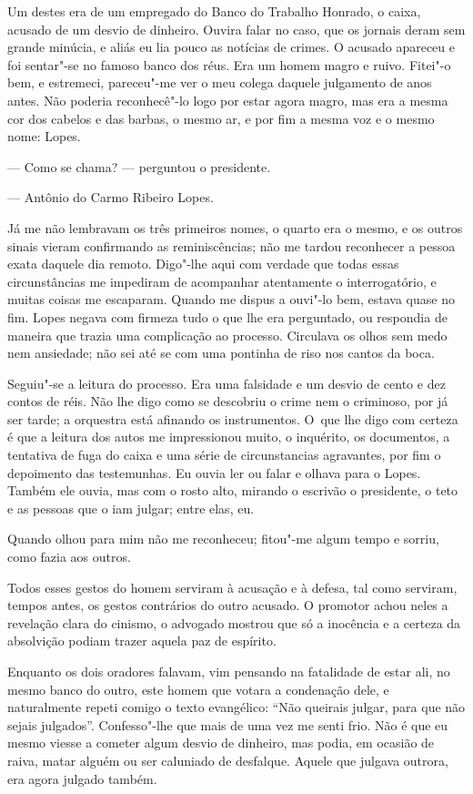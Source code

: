 \begin{linenumbers}
Um destes era de um empregado do Banco do Trabalho Honrado, o caixa,
acusado de um desvio de dinheiro. Ouvira falar no caso, que os jornais
deram sem grande minúcia, e aliás eu lia pouco as notícias de crimes. O
acusado apareceu e foi sentar"-se no famoso banco dos réus. Era um homem
magro e ruivo. Fitei"-o bem, e estremeci, pareceu"-me ver o meu colega
daquele julgamento de anos antes. Não poderia reconhecê"-lo logo por
estar agora magro, mas era a mesma cor dos cabelos e das barbas, o mesmo
ar, e por fim a mesma voz e o mesmo nome: Lopes.

--- Como se chama? --- perguntou o presidente.

--- Antônio do Carmo Ribeiro Lopes.

Já me não lembravam os três primeiros nomes, o quarto era o mesmo, e os
outros sinais vieram confirmando as reminiscências; não me tardou
reconhecer a pessoa exata daquele dia remoto. Digo"-lhe aqui com verdade
que todas essas circunstâncias me impediram de acompanhar atentamente o
interrogatório, e muitas coisas me escaparam. Quando me dispus a ouvi"-lo
bem, estava quase no fim. Lopes negava com firmeza tudo o que lhe era
perguntado, ou respondia de maneira que trazia uma complicação ao
processo. Circulava os olhos sem medo nem ansiedade; não sei até se com
uma pontinha de riso nos cantos da boca.

Seguiu"-se a leitura do processo. Era uma falsidade e um desvio de cento
e dez contos de réis. Não lhe digo como se descobriu o crime nem o
criminoso, por já ser tarde; a orquestra está afinando os instrumentos.
O~que lhe digo com certeza é que a leitura dos autos me impressionou
muito, o inquérito, os documentos, a tentativa de fuga do caixa e uma
série de circunstancias agravantes, por fim o depoimento das
testemunhas. Eu ouvia ler ou falar e olhava para o Lopes. Também ele
ouvia, mas com o rosto alto, mirando o escrivão o presidente, o teto e
as pessoas que o iam julgar; entre elas, eu.

Quando olhou para mim não me reconheceu; fitou"-me algum tempo e sorriu,
como fazia aos outros.

Todos esses gestos do homem serviram à acusação e à defesa, tal como
serviram, tempos antes, os gestos contrários do outro acusado. O
promotor achou neles a revelação clara do cinismo, o advogado mostrou
que só a inocência e a certeza da absolvição podiam trazer aquela paz de
espírito.

Enquanto os dois oradores falavam, vim pensando na fatalidade de estar
ali, no mesmo banco do outro, este homem que votara a condenação dele, e
naturalmente repeti comigo o texto evangélico: ``Não queirais julgar,
para que não sejais julgados''. Confesso"-lhe que mais de uma vez me
senti frio. Não é que eu mesmo viesse a cometer algum desvio de
dinheiro, mas podia, em ocasião de raiva, matar alguém ou ser caluniado
de desfalque. Aquele que julgava outrora, era agora julgado também.


\end{linenumbers}
